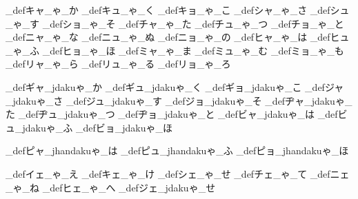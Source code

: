 \brl@char_def{キャ}{\brl@char@alias_ゃ\brl@char@alias_か}
\brl@char_def{キュ}{\brl@char@alias_ゃ\brl@char@alias_く}
\brl@char_def{キョ}{\brl@char@alias_ゃ\brl@char@alias_こ}
\brl@char_def{シャ}{\brl@char@alias_ゃ\brl@char@alias_さ}
\brl@char_def{シュ}{\brl@char@alias_ゃ\brl@char@alias_す}
\brl@char_def{ショ}{\brl@char@alias_ゃ\brl@char@alias_そ}
\brl@char_def{チャ}{\brl@char@alias_ゃ\brl@char@alias_た}
\brl@char_def{チュ}{\brl@char@alias_ゃ\brl@char@alias_つ}
\brl@char_def{チョ}{\brl@char@alias_ゃ\brl@char@alias_と}
\brl@char_def{ニャ}{\brl@char@alias_ゃ\brl@char@alias_な}
\brl@char_def{ニュ}{\brl@char@alias_ゃ\brl@char@alias_ぬ}
\brl@char_def{ニョ}{\brl@char@alias_ゃ\brl@char@alias_の}
\brl@char_def{ヒャ}{\brl@char@alias_ゃ\brl@char@alias_は}
\brl@char_def{ヒュ}{\brl@char@alias_ゃ\brl@char@alias_ふ}
\brl@char_def{ヒョ}{\brl@char@alias_ゃ\brl@char@alias_ほ}
\brl@char_def{ミャ}{\brl@char@alias_ゃ\brl@char@alias_ま}
\brl@char_def{ミュ}{\brl@char@alias_ゃ\brl@char@alias_む}
\brl@char_def{ミョ}{\brl@char@alias_ゃ\brl@char@alias_も}
\brl@char_def{リャ}{\brl@char@alias_ゃ\brl@char@alias_ら}
\brl@char_def{リュ}{\brl@char@alias_ゃ\brl@char@alias_る}
\brl@char_def{リョ}{\brl@char@alias_ゃ\brl@char@alias_ろ}

\brl@char_def{ギャ}{\brl@char@alias_jdakuゃ\brl@char@alias_か}
\brl@char_def{ギュ}{\brl@char@alias_jdakuゃ\brl@char@alias_く}
\brl@char_def{ギョ}{\brl@char@alias_jdakuゃ\brl@char@alias_こ}
\brl@char_def{ジャ}{\brl@char@alias_jdakuゃ\brl@char@alias_さ}
\brl@char_def{ジュ}{\brl@char@alias_jdakuゃ\brl@char@alias_す}
\brl@char_def{ジョ}{\brl@char@alias_jdakuゃ\brl@char@alias_そ}
\brl@char_def{ヂャ}{\brl@char@alias_jdakuゃ\brl@char@alias_た}
\brl@char_def{ヂュ}{\brl@char@alias_jdakuゃ\brl@char@alias_つ}
\brl@char_def{ヂョ}{\brl@char@alias_jdakuゃ\brl@char@alias_と}
\brl@char_def{ビャ}{\brl@char@alias_jdakuゃ\brl@char@alias_は}
\brl@char_def{ビュ}{\brl@char@alias_jdakuゃ\brl@char@alias_ふ}
\brl@char_def{ビョ}{\brl@char@alias_jdakuゃ\brl@char@alias_ほ}

\brl@char_def{ピャ}{\brl@char@alias_jhandakuゃ\brl@char@alias_は}
\brl@char_def{ピュ}{\brl@char@alias_jhandakuゃ\brl@char@alias_ふ}
\brl@char_def{ピョ}{\brl@char@alias_jhandakuゃ\brl@char@alias_ほ}

\brl@char_def{イェ}{\brl@char@alias_ゃ\brl@char@alias_え}
\brl@char_def{キェ}{\brl@char@alias_ゃ\brl@char@alias_け}
\brl@char_def{シェ}{\brl@char@alias_ゃ\brl@char@alias_せ}
\brl@char_def{チェ}{\brl@char@alias_ゃ\brl@char@alias_て}
\brl@char_def{ニェ}{\brl@char@alias_ゃ\brl@char@alias_ね}
\brl@char_def{ヒェ}{\brl@char@alias_ゃ\brl@char@alias_へ}
\brl@char_def{ジェ}{\brl@char@alias_jdakuゃ\brl@char@alias_せ}


